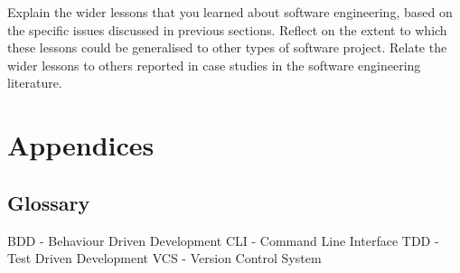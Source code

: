 \documentclass{l3proj}
\begin{document}
Explain the wider lessons that you learned about software engineering,
based on the specific issues discussed in previous sections.  Reflect
on the extent to which these lessons could be generalised to other
types of software project.  Relate the wider lessons to others
reported in case studies in the software engineering literature.


\section{Appendices}
\label{sec:appendices}

\subsection{Glossary}
\label{subsec:appendices:glossary}
BDD - Behaviour Driven Development
CLI - Command Line Interface
TDD - Test Driven Development
VCS - Version Control System




\end{document}
